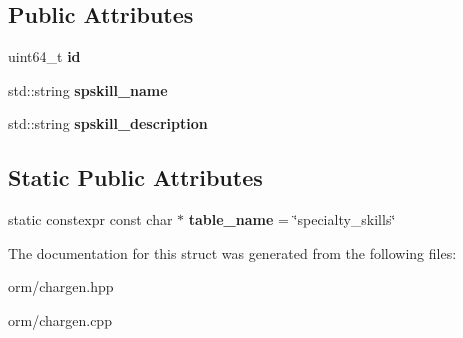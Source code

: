\subsection*{Public Attributes}
\begin{DoxyCompactItemize}
\item 
\mbox{\label{structmods_1_1orm_1_1specialty__skills_af8eacb31ba59bf0e259dab46cce5992d}} 
uint64\+\_\+t {\bfseries id}
\item 
\mbox{\label{structmods_1_1orm_1_1specialty__skills_a8256ef3be969761db79c7e1a2be3a355}} 
std\+::string {\bfseries spskill\+\_\+name}
\item 
\mbox{\label{structmods_1_1orm_1_1specialty__skills_a44221297084c958de5eafea4508e4af5}} 
std\+::string {\bfseries spskill\+\_\+description}
\end{DoxyCompactItemize}
\subsection*{Static Public Attributes}
\begin{DoxyCompactItemize}
\item 
\mbox{\label{structmods_1_1orm_1_1specialty__skills_aaf6fe95703728bee69bf26ffe604cca4}} 
static constexpr const char $\ast$ {\bfseries table\+\_\+name} = \char`\"{}specialty\+\_\+skills\char`\"{}
\end{DoxyCompactItemize}


The documentation for this struct was generated from the following files\+:\begin{DoxyCompactItemize}
\item 
orm/chargen.\+hpp\item 
orm/chargen.\+cpp\end{DoxyCompactItemize}
